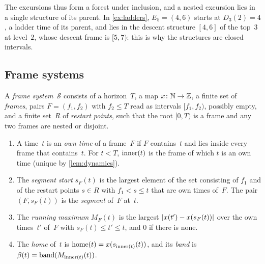 The excursions thus form a forest under inclusion, and a nested excursion lies in a single structure of its parent. In
\cref{ex:ladders}, $E_5=(4,6)$ starts at $D_3(2)=4$, a ladder time of its parent, and lies in the descent structure $[4,6]$ of
the top~$3$ at level~$2$, whose descent frame is $[5,7)$: this is why the structures are closed intervals.

\subsection{Frame systems}\label{sec:ladders-framesystems}

\begin{definition}\label{def:framesystem}
A \emph{frame system}~$\mathcal S$ consists of a horizon~$T$, a map $x\colon\mathbb{N}\to\mathbb{Z}$, a finite set of \emph{frames}, pairs
$F=(f_1,f_2)$ with $f_2\le T$ read as intervals $[f_1,f_2)$, possibly empty, and a finite set~$R$ of \emph{restart points}, such
that the root $[0,T)$ is a frame and any two frames are nested or disjoint.
\begin{enumerate}[label=(\alph*)]
\item A time~$t$ is an \emph{own time} of a frame~$F$ if $F$ contains~$t$ and lies inside every frame that contains~$t$. For
$t<T$, $\operatorname{inner}(t)$ is the frame of which $t$ is an own time (unique by \cref{lem:dynamics}).
\item The \emph{segment start} $s_F(t)$ is the largest element of the set consisting of $f_1$ and of the restart points
$s\in R$ with $f_1<s\le t$ that are own times of~$F$. The pair $(F,s_F(t))$ is the \emph{segment} of~$F$ at~$t$.
\item The \emph{running maximum} $M_F(t)$ is the largest $\lvert x(t')-x(s_F(t)) \rvert$ over the own times~$t'$ of~$F$ with
$s_F(t)\le t'\le t$, and $0$ if there is none.
\item The \emph{home} of~$t$ is $\operatorname{home}(t)=x(s_{\operatorname{inner}(t)}(t))$, and its \emph{band} is $\beta(t)=\operatorname{band}(M_{\operatorname{inner}(t)}(t))$.
\end{enumerate}
\end{definition}

